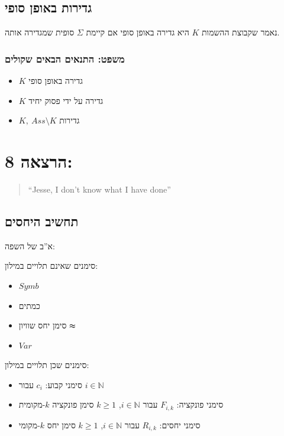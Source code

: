 \documentclass[12pt,a4paper]{article}
\begin{document}
\subsection*{גדירות באופן סופי}

נאמר שקבוצת ההשמות $K$ היא גדירה באופן סופי אם קיימת $\Sigma$ סופית שמגדירה אותה.

\subsubsection*{משפט: התנאים הבאים שקולים}

\begin{itemize}
  \item $K$ גדירה באופן סופי
  \item $K$ גדירה על ידי פסוק יחיד
  \item $K,\ Ass\setminus K$ גדירות
\end{itemize}

\section*{הרצאה 8:}

\begin{quote}
\textenglish{``Jesse, I don't know what I have done''}
\end{quote}

\subsection*{תחשיב היחסים}

א''ב של השפה:

סימנים שאינם תלויים במילון:

\begin{itemize}
  \item $Symb$
  \item כמתים
  \item סימן יחס שוויון $\thickapprox$
  \item $Var$
\end{itemize}

סימנים שכן תלויים במילון:

\begin{itemize}
  \item סימני קבוע: $c_{i}$ עבור $i\in\mathbb{N}$
  \item סימני פונקציה: $F_{i,k}$ עבור $i\in\mathbb{N}$, $k\geq1$ סימן פונקציה $k$-מקומית
  \item סימני יחסים: $R_{i,k}$ עבור $i\in\mathbb{N}$, $k\geq1$ סימן יחס $k$-מקומי
\end{itemize}
\end{document}
